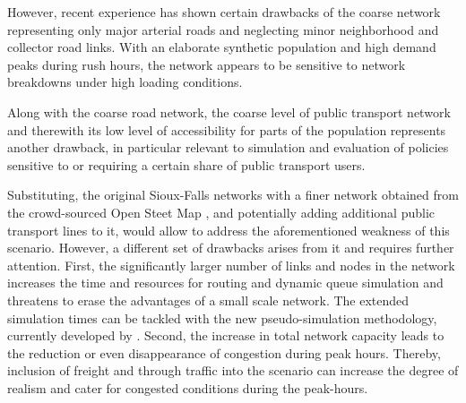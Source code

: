 However, recent experience has shown certain drawbacks of the coarse network representing only major arterial roads and neglecting minor neighborhood and collector road links. With an elaborate synthetic population and high demand peaks during rush hours, the network appears to be sensitive to network breakdowns under high loading conditions. 

Along with the coarse road network, the coarse level of public transport network and therewith its low level of accessibility for parts of the population represents another drawback, in particular relevant to simulation and evaluation of policies sensitive to or requiring a certain share of public transport users. 

Substituting, the original Sioux-Falls networks with a finer network obtained from the crowd-sourced Open Steet Map \citep[][]{OpenStreetMap_Webpage_2015}, and potentially adding additional public transport lines to it, would allow to address the aforementioned weakness of this scenario. However, a different set of drawbacks arises from it and requires further attention. First, the significantly larger number of links and nodes in the network increases the time and resources for routing and dynamic queue simulation and threatens to erase the advantages of a small scale network. The extended simulation times can be tackled with the new pseudo-simulation methodology, currently developed by \citet[][]{FourieEtAl_TRR_2013}.
Second, the increase in total network capacity leads to the reduction or even disappearance of congestion during peak hours. Thereby, inclusion of freight and through traffic into the scenario can increase the degree of realism and cater for congested conditions during the peak-hours. 


